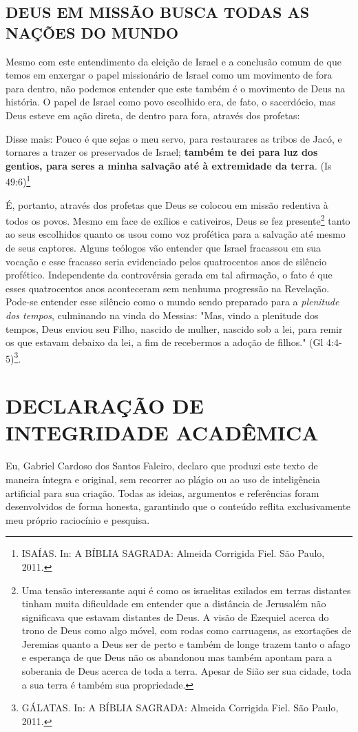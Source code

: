 \documentclass[
    article,            %
	12pt,				%
	oneside,			%
	a4paper,			%
	chapter=TITLE,		%
	section=TITLE,		%
	english,			%
	french,				%
	spanish,			%
	brazil				%
	]{abntex2}
\begin{document}
\subsection{DEUS EM MISSÃO BUSCA TODAS AS NAÇÕES DO MUNDO}
Mesmo com este entendimento da eleição de Israel e a conclusão comum de que temos em enxergar o papel missionário de Israel como um movimento de fora para dentro, não podemos entender que este também é o movimento de Deus na história. O papel de Israel como povo escolhido era, de fato, o sacerdócio, mas Deus esteve em ação direta, de dentro para fora, através dos profetas:
\begin{citacao}
Disse mais: Pouco é que sejas o meu servo, para restaurares as tribos de Jacó, e tornares a trazer os preservados de Israel; \textbf{também te dei para luz dos gentios, para seres a minha salvação até à extremidade da terra}. (Is 49:6)\footnote{ISAÍAS. In: A BÍBLIA SAGRADA: Almeida Corrigida Fiel. São Paulo, 2011.}
\end{citacao}
É, portanto, através dos profetas que Deus se colocou em missão redentiva à todos os povos. Mesmo em face de exílios e cativeiros, Deus se fez presente\footnote{Uma tensão interessante aqui é como os israelitas exilados em terras distantes tinham muita dificuldade em entender que a distância de Jerusalém não significava que estavam distantes de Deus. A visão de Ezequiel acerca do trono de Deus como algo móvel, com rodas como carruagens, as exortações de Jeremias quanto a Deus ser de perto e também de longe trazem tanto o afago e esperança de que Deus não os abandonou mas também apontam para a soberania de Deus acerca de toda a terra. Apesar de Sião ser sua cidade, toda a sua terra é também sua propriedade.} tanto ao seus escolhidos quanto os usou como voz profética para a salvação até mesmo de seus captores. Alguns teólogos vão entender que Israel fracassou em sua vocação e esse fracasso seria evidenciado pelos quatrocentos anos de silêncio profético. Independente da controvérsia gerada em tal afirmação, o fato é que esses quatrocentos anos aconteceram sem nenhuma progressão na Revelação. Pode-se entender esse silêncio como o mundo sendo preparado para a \emph{plenitude dos tempos}, culminando na vinda do Messias: "Mas, vindo a plenitude dos tempos, Deus enviou seu Filho, nascido de mulher, nascido sob a lei, para remir os que estavam debaixo da lei, a fim de recebermos a adoção de filhos." (Gl 4:4-5)\footnote{GÁLATAS. In: A BÍBLIA SAGRADA: Almeida Corrigida Fiel. São Paulo, 2011.}.



\pagebreak
\section{DECLARAÇÃO DE INTEGRIDADE ACADÊMICA}
Eu, Gabriel Cardoso dos Santos Faleiro, declaro que produzi este texto de maneira íntegra e original, sem recorrer ao plágio ou ao uso de inteligência artificial para sua criação. Todas as ideias, argumentos e referências foram desenvolvidos de forma honesta, garantindo que o conteúdo reflita exclusivamente meu próprio raciocínio e pesquisa.
\pagebreak

\nocite{BIBLIA}
\nocite{EDILSON}
\renewcommand{\bibname}{{REFER\^ENCIAS}}

\end{document}
